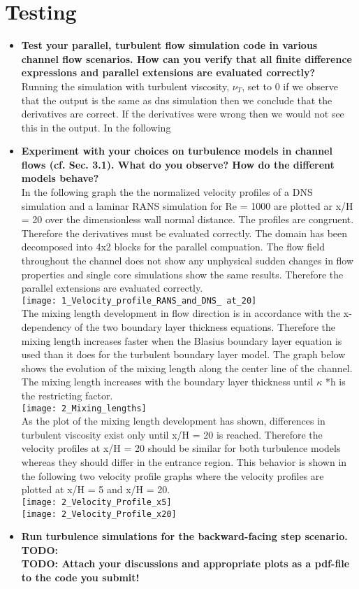 \documentclass[a4paper]{article}
\newcommand{\td}[1]{
	\textbf{\color{red}TODO: {#1}}
}
\begin{document}
\section{Testing}
\begin{itemize}
	\item \textbf{Test your parallel, turbulent flow simulation code in various channel flow scenarios. How can you verify that all finite difference expressions and parallel extensions are evaluated correctly?}\\
	Running the simulation with turbulent viscosity, $\nu_{T}$, set to 0 if we observe that the output is the same as dns simulation then we conclude that the derivatives are correct. If the derivatives were wrong then we would not see this in the output.
In the following 
	\item \textbf{Experiment with your choices on turbulence models in channel flows (cf. Sec. 3.1). What do you observe? How do the different models behave?}\\
	In the following graph the the normalized velocity profiles of a DNS simulation and a laminar RANS simulation for Re = 1000 are plotted ar x/H = 20 over the dimensionless wall normal distance. The profiles are congruent. Therefore the derivatives must be evaluated correctly. The domain has been decomposed into 4x2 blocks for the parallel compuation. The flow field throughout the channel does not show any unphysical sudden changes in flow properties and single core simulations show the same results. Therefore the parallel extensions are evaluated correctly.\\ 
\texttt{[image: 1\_Velocity\_profile\_RANS\_and\_DNS\_ at\_20]}\\

The mixing length development in flow direction is in accordance with the x-dependency of the two boundary layer thickness equations. Therefore the mixing length increases faster when the Blasius boundary layer equation is used than it does for the turbulent boundary layer model. The graph below shows the evolution of the mixing length along the center line of the channel. The mixing length increases with the boundary layer thickness until $\kappa$ *h is the restricting factor. \\

\texttt{[image: 2\_Mixing\_lengths]}\\

As the plot of the mixing length development has shown, differences in turbulent viscosity exist only until x/H = 20 is reached. Therefore the velocity profiles at x/H = 20 should be similar for both turbulence models whereas they should differ in the entrance region. This behavior is shown in the following two velocity profile graphs where the velocity profiles are plotted at x/H = 5 and x/H = 20. \\

\texttt{[image: 2\_Velocity\_Profile\_x5]}\\

\texttt{[image: 2\_Velocity\_Profile\_x20]}\\

	\item\textbf{Run turbulence simulations for the backward-facing step scenario.}\\
	\td{}\\
	\td{Attach your discussions and appropriate plots as a pdf-file to the code you submit!}
\end{itemize}
\end{document}
